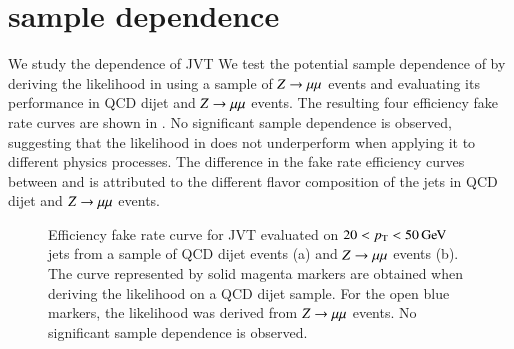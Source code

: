\section{\JVT sample dependence}
\label{app:sample_dep}


We study the dependence of JVT
We test the potential sample dependence of \JVT by deriving the \JVT likelihood in  using a sample of $Z \rightarrow \mu\mu$ events and 
evaluating its performance in QCD dijet and $Z \rightarrow \mu\mu$ events. The resulting four efficiency \vs fake rate curves are shown in . No
significant sample dependence is observed, 
suggesting that the \JVT likelihood in  does not underperform when applying it to different physics processes. 
The difference in the fake rate \vs efficiency curves between  and  is attributed to the 
different flavor composition of the jets in QCD dijet and $Z \rightarrow \mu\mu$ events. 
\begin{figure}[!htbp]
  \centering
  \caption{Efficiency \vs fake rate curve for JVT evaluated on $20 < p_{\mathrm{T}} < 50\,\text{Ge\hspace{-.08em}V}$ jets from a sample of QCD dijet events (a) and $Z \rightarrow \mu\mu$ events (b). 
           The curve represented by solid magenta markers are obtained when deriving the \JVT likelihood on a QCD dijet sample. For the 
           open blue markers, the \JVT likelihood was derived from $Z \rightarrow \mu\mu$ events. No significant sample dependence is observed. }
\label{fig:SampleDependence}
\end{figure}
